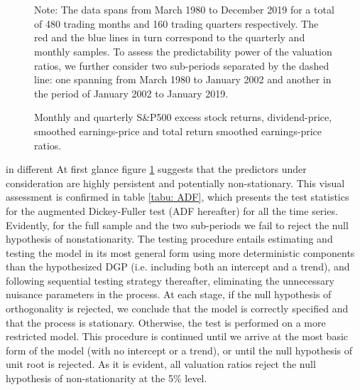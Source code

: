\documentclass[harvard,11pt]{article}
\begin{document}
\begin{figure}[hbtp!]
\caption{Monthly and quarterly S\&P500 excess stock returns, dividend-price, smoothed earnings-price and total return smoothed earnings-price ratios.}
\begin{center}
 \\[0pt]
\\[0pt]
\end{center}
Note: The data spans from March 1980 to December 2019 for a total of 480 trading months and 160 trading quarters respectively. The red and the blue lines in turn correspond to the quarterly and monthly samples. To assess the predictability power of the valuation ratios, we further consider two sub-periods separated by the dashed line: one spanning from March 1980 to January 2002 and another in the period of January 2002 to January 2019.
\label{fig: Plots of Time-seriesC1}
\end{figure}
  in different At first glance figure \ref{fig: Plots of Time-seriesC1} suggests that the predictors under consideration are highly persistent and potentially non-stationary. This visual assessment is confirmed in table \ref{tabu: ADF}, which presents the test statistics for the augmented Dickey-Fuller test (ADF hereafter) for all the time series. Evidently, for the full sample and the two sub-periods we fail to reject the null hypothesis of nonstationarity. The testing procedure entails estimating and testing the model in its most general form using more deterministic components than the hypothesized DGP (i.e. including both an intercept and a trend), and following \citet{phillips1988testing} sequential testing strategy thereafter, eliminating the unnecessary nuisance parameters in the process. At each stage, if the null hypothesis of orthogonality is rejected, we conclude that the model is correctly specified and that the process is stationary. Otherwise, the test is performed on a more restricted model. This procedure is continued until we arrive at the most basic form of the model (with no intercept or a trend), or until the null hypothesis of unit root is rejected. As it is evident, all valuation ratios reject the null hypothesis of non-stationarity at the 5\% level. 
\end{document}

